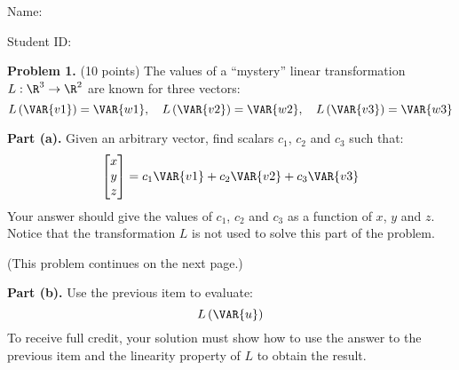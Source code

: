 \documentclass[12pt]{article}
\begin{document}
Name: \hrulefill

\bigskip
Student ID: \hrulefill


\textbf{Problem 1.} (10 points)
The values of a ``mystery'' linear transformation $L:\R^3\to\R^2$ are known for three vectors:
\[
L\left(\VAR{v1}\right)=\VAR{w1},\quad 
L\left(\VAR{v2}\right)=\VAR{w2},\quad 
L\left(\VAR{v3}\right)=\VAR{w3}
\]

\textbf{Part (a).} Given an arbitrary vector, find scalars $c_1$, $c_2$ and $c_3$ such that:
\[
\begin{bmatrix}x\\y\\z\end{bmatrix}=c_1\VAR{v1}+c_2\VAR{v2}+c_3\VAR{v3}
\]
Your answer should give the values of $c_1$, $c_2$ and $c_3$ as a function of $x$, $y$ and $z$. Notice that the transformation $L$ is not used to solve this part of the problem.

\vfill
(This problem continues on the next page.)

\clearpage

\textbf{Part (b).} Use the previous item to evaluate:
\[
L\left(\VAR{u}\right)
\]
To receive full credit, your solution must show how to use the answer to the previous item and the linearity property of $L$ to obtain the result. 
\end{document}
